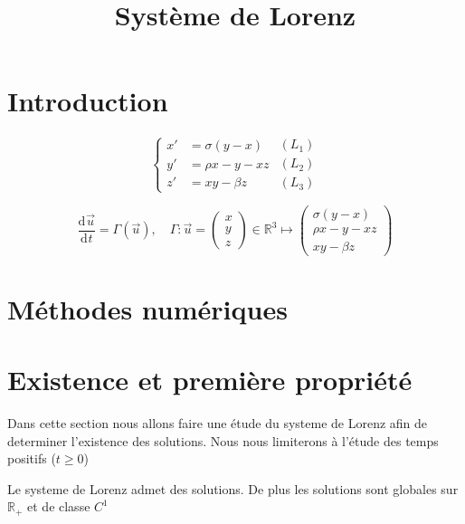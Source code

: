 \documentclass{article}
\title{Système de Lorenz}
\newcommand*\colv[1]{
\left(\begin{array}{c}
    #1
\end{array}\right)
}
\newcommand{\R}{\mathbb{R}}
\newcommand{\deriv}[3][ ]{
    \ensuremath{\frac{\mathrm{d}^{#1}#2}{\mathrm{d}^{#1} #3}}
}
\newtheorem[M]{prop}{Proposition}[section]
\newtheorem[M]{propt}{Propriété}[section]
\newtheorem[L]{thm}{Théoreme}
\newtheorem[L]{cor}{Corollaire}
\begin{document}
\maketitle

\section*{Introduction}

\begin{equation}
    \label{Lorenz}
    \left\{
    \begin{array}{rl}
        x' &=\sigma(y-x) \\
        y' &=\rho x -y - xz\\
        z' &=xy - \beta z
    \end{array}
    \right.
    \begin{array}{r}
        (L_1)\\
        (L_2)\\
        (L_3)
    \end{array}
\end{equation}

\begin{equation}
    \label{fLorenz}
    \deriv{\Vec{u}}{t} = \Gamma(\Vec{u}), \quad
    \Gamma : \Vec{u} = \colv{x\\y\\z} \in \R^3 \mapsto \colv{\sigma(y-x) \\ \rho x-y-xz \\ xy-\beta z}
    \end{equation}

\section{Méthodes numériques}


\section{Existence et première propriété}

Dans cette section nous allons faire une étude du systeme de Lorenz afin de determiner l'existence des solutions. Nous nous limiterons à l'étude des temps positifs ($t \ge 0$)

\begin{prop}
    Le systeme de Lorenz admet des solutions. De plus les solutions sont globales sur $\R_+$ et de classe $C^1$
\end{prop}
\end{document}
